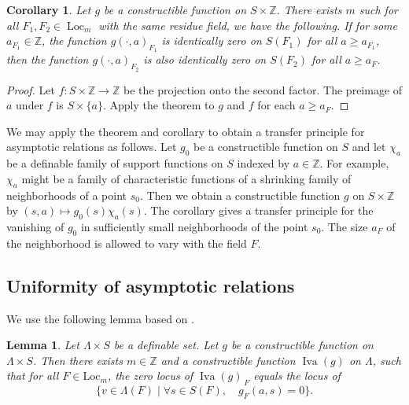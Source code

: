 \documentclass[12pt]{amsart}
\newcommand{\op}[1]{\operatorname{#1}}
\newcommand{\ring}[1]{{\mathbb #1}}
\newcommand{\locus}[1]{\op{Iva}(#1)}
\newcommand{\Loc}{\mathrm{Loc}}
\theoremstyle{plain}
\newtheorem{lem}[thm]{Lemma}
\newtheorem{cor}[thm]{Corollary}
\theoremstyle{definition}
\begin{document}
\begin{cor}\label{cor:12} Let $g$ be a constructible function on $S\times\ring{Z}$.
  There exists $m$ such for all $F_1,F_2\in\op{Loc}_m$ with the same
  residue field, we have the following.  If for some $a_{F_1}\in\ring{Z}$, the
  function $g(\cdot,a)_{F_1}$ is identically zero on $S(F_1)$ for all $a\ge
  a_{F_1}$, then the function $g(\cdot,a)_{F_2}$ is also identically zero
  on $S(F_2)$ for all $a\ge a_F$.
\end{cor}

\begin{proof} Let $f:S\times \ring{Z}\to\ring{Z}$ be the projection
  onto the second factor.  The preimage of $a$ under $f$ is
  $S\times\{a\}$.  Apply the theorem to $g$ and $f$ for each $a\ge
  a_F$.
\end{proof}

We may apply the theorem and corollary to obtain a transfer principle
for asymptotic relations as follows.  Let $g_0$ be a constructible
function on $S$ and let $\chi_a$ be a definable family of support
functions on $S$ indexed by $a\in\ring{Z}$.  For example, $\chi_a$ might
be a family of characteristic functions of a shrinking family of
neighborhoods of a point $s_0$.  Then we obtain a constructible
function $g$ on $S\times\ring{Z}$ by $(s,a)\mapsto g_0(s)\chi_a(s)$.
The corollary gives a transfer principle for the vanishing of $g_0$ in
sufficiently small neighborhoods of the point $s_0$.  The size $a_F$ of the
neighborhood is allowed to vary with the field $F$.

\subsection{Uniformity of asymptotic relations}

We use the following lemma based on \cite[Th 4.4.4]{CGH}.

\begin{lem}  
  Let $\Lambda\times S$ be a definable set.  Let $g$ be a
  constructible function on $\Lambda\times S$.  Then there exists
  $m\in\ring{Z}$ and a constructible function $\locus{g}$ on $\Lambda$,
  such that for all $F\in\Loc_m$, the zero locus of $\locus{g}_{\,F}$
  equals the locus of
\[
\{v\in \Lambda(F)\mid \forall s\in S(F),\quad g_F(a,s)=0\}.
\]
\end{lem}
\end{document}
